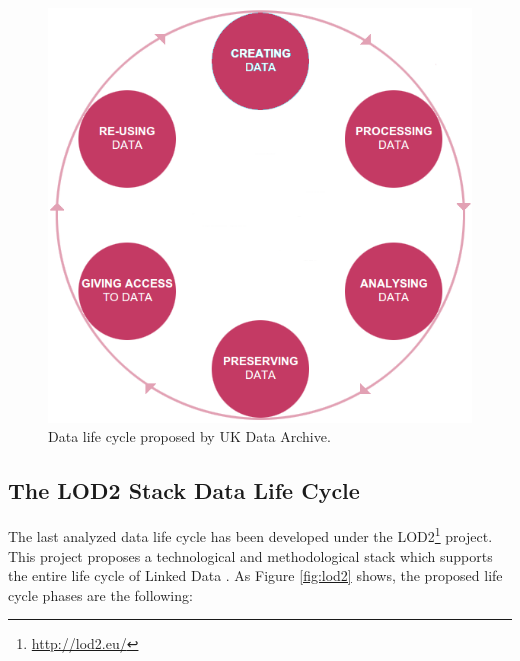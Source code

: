 \begin{figure}
    \center
    \includegraphics[scale=0.3]{img/data_lifecycle/uk-data-archive.png}
    \caption{Data life cycle proposed by UK Data Archive.}
    \label{fig:uk-data-archive}
\end{figure}

\subsection{The LOD2 Stack Data Life Cycle}

The last analyzed data life cycle has been developed under the LOD2\footnote{\url{http://lod2.eu/}} project. This project proposes a technological and methodological stack which supports the entire life cycle of Linked Data \cite{auer_managing_2012}. As Figure \ref{fig:lod2} shows, the proposed life cycle phases are the following:

